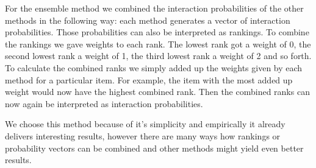For the ensemble method we combined the interaction probabilities of the other methods in the following way: each method generates a vector of interaction probabilities. Those probabilities can also be interpreted as rankings. To combine the rankings we gave weights to each rank. The lowest rank got a weight of 0, the second lowest rank a weight of 1, the third lowest rank a weight of 2 and so forth. To calculate the combined ranks we simply added up the weights given by each method for a particular item. For example, the item with the most added up weight would now have the highest combined rank. Then the combined ranks can now again be interpreted as interaction probabilities.

We choose this method because of it's simplicity and empirically it already delivers interesting results, however there are many ways how rankings or probability vectors can be combined and other methods might yield even better results.
